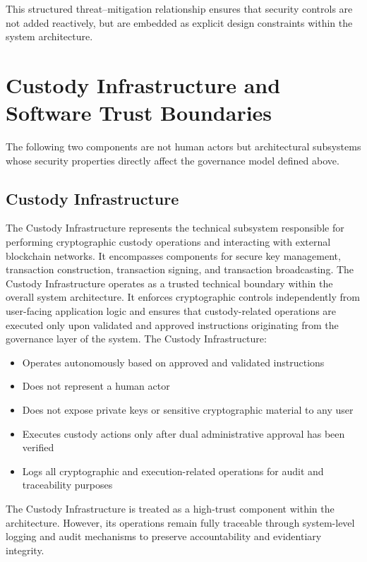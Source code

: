 \documentclass[12pt,a4paper]{report}
\begin{document}
This structured threat–mitigation relationship ensures that security controls are not added reactively, but are embedded as explicit design constraints within the system architecture.

\section{Custody Infrastructure and Software Trust Boundaries}

The following two components are not human actors but architectural subsystems whose security properties directly affect the governance model defined above.

\subsection{Custody Infrastructure}

The Custody Infrastructure represents the technical subsystem responsible for performing cryptographic custody operations and interacting with external blockchain networks. It encompasses components for secure key management, transaction construction, transaction signing, and transaction broadcasting.
The Custody Infrastructure operates as a trusted technical boundary within the overall system architecture. It enforces cryptographic controls independently from user-facing application logic and ensures that custody-related operations are executed only upon validated and approved instructions originating from the governance layer of the system.
The Custody Infrastructure:

\begin{itemize}
\item Operates autonomously based on approved and validated instructions
\item Does not represent a human actor
\item Does not expose private keys or sensitive cryptographic material to any user
\item Executes custody actions only after dual administrative approval has been verified
\item Logs all cryptographic and execution-related operations for audit and traceability purposes
\end{itemize}
The Custody Infrastructure is treated as a high-trust component within the architecture. However, its operations remain fully traceable through system-level logging and audit mechanisms to preserve accountability and evidentiary integrity.
\end{document}
